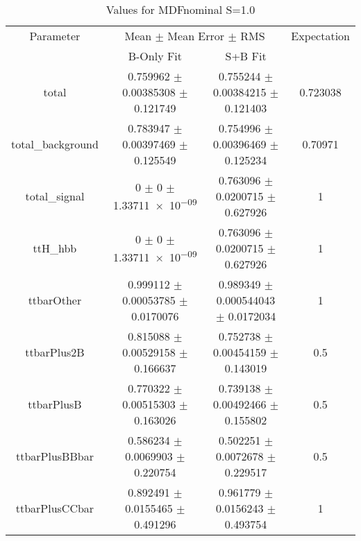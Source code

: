 \begin{table}
\centering
\caption{Values for MDFnominal S=1.0}
\begin{tabular}{cccc}
\toprule
Parameter & \multicolumn{2}{c}{Mean $\pm$ Mean Error $\pm$ RMS} & Expectation\\
 & B-Only Fit & S+B Fit & \\
\midrule
total & \num{0.759962} $\pm$ \num{0.00385308} $\pm$ \num{0.121749} & \num{0.755244} $\pm$ \num{0.00384215} $\pm$ \num{0.121403} & \num{0.723038}\\
total\_background & \num{0.783947} $\pm$ \num{0.00397469} $\pm$ \num{0.125549} & \num{0.754996} $\pm$ \num{0.00396469} $\pm$ \num{0.125234} & \num{0.70971}\\
total\_signal & \num{0} $\pm$ \num{0} $\pm$ \num{1.33711e-09} & \num{0.763096} $\pm$ \num{0.0200715} $\pm$ \num{0.627926} & \num{1}\\
ttH\_hbb & \num{0} $\pm$ \num{0} $\pm$ \num{1.33711e-09} & \num{0.763096} $\pm$ \num{0.0200715} $\pm$ \num{0.627926} & \num{1}\\
ttbarOther & \num{0.999112} $\pm$ \num{0.00053785} $\pm$ \num{0.0170076} & \num{0.989349} $\pm$ \num{0.000544043} $\pm$ \num{0.0172034} & \num{1}\\
ttbarPlus2B & \num{0.815088} $\pm$ \num{0.00529158} $\pm$ \num{0.166637} & \num{0.752738} $\pm$ \num{0.00454159} $\pm$ \num{0.143019} & \num{0.5}\\
ttbarPlusB & \num{0.770322} $\pm$ \num{0.00515303} $\pm$ \num{0.163026} & \num{0.739138} $\pm$ \num{0.00492466} $\pm$ \num{0.155802} & \num{0.5}\\
ttbarPlusBBbar & \num{0.586234} $\pm$ \num{0.0069903} $\pm$ \num{0.220754} & \num{0.502251} $\pm$ \num{0.0072678} $\pm$ \num{0.229517} & \num{0.5}\\
ttbarPlusCCbar & \num{0.892491} $\pm$ \num{0.0155465} $\pm$ \num{0.491296} & \num{0.961779} $\pm$ \num{0.0156243} $\pm$ \num{0.493754} & \num{1}\\
\bottomrule
\end{tabular}
\end{table}